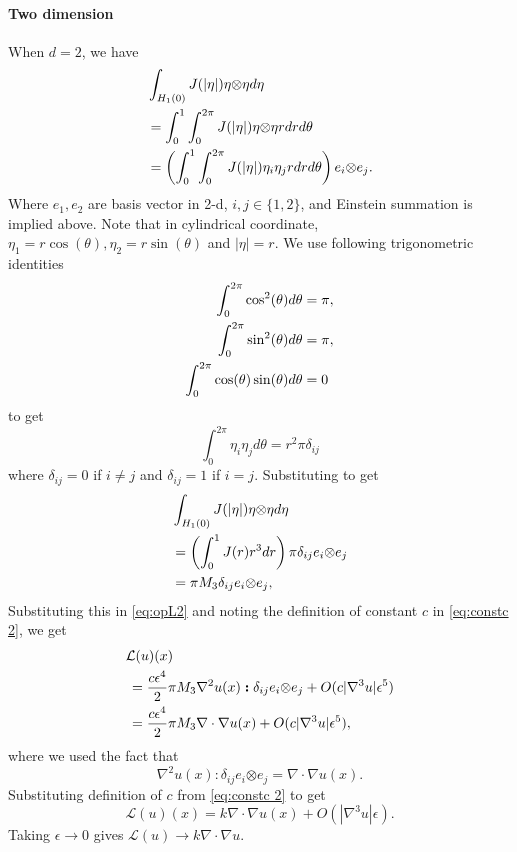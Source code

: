 \documentclass[11pt,twocolumn]{amsart}
\theoremstyle{definition}
\theoremstyle{definition}
\numberwithin{equation}{section}
\numberwithin{equation}{section}
\newcommand{\calL}{\mathcal{L}}  %
\newcommand{\bcolon}{\boldsymbol{:}}
\newcommand{\dyad}{\mathbf{\otimes}}
\begin{document}
\begin{appendices}
\paragraph{Two dimension} When $d=2$, we have
\begin{align*}
&\int_{H_1(0)}  J(|\eta|) \eta \dyad \eta d\eta\notag \\
&=\int_0^1 \int_0^{2\pi} J(|\eta|) \eta\dyad\eta rdrd\theta \notag \\
&= \left(\int_0^1 \int_0^{2\pi} J(|\eta|) \eta_i \eta_j rdrd\theta \right) e_i \dyad e_j.
\end{align*}
Where $e_1, e_2$ are basis vector in 2-d, $i,j\in \{1,2\}$, and Einstein summation is implied above. Note that in cylindrical coordinate, $\eta_1 = r\cos(\theta), \eta_2 = r\sin(\theta)$ and $|\eta| = r$. We use following trigonometric identities
\begin{align}\label{eq:trig}
\int_0^{2\pi} \cos^2(\theta) d\theta &= \pi, \notag \\
\int_0^{2\pi} \sin^2(\theta) d\theta &= \pi, \notag \\
\int_0^{2\pi} \cos(\theta) \sin(\theta) d\theta &= 0
\end{align}
to get 
$$
 \int_0^{2\pi} \eta_i \eta_j d\theta = r^2 \pi \delta_{ij}
$$
where $\delta_{ij} = 0$ if $i\neq j$ and $\delta_{ij} = 1$ if $i=j$. Substituting to get
\begin{align*}
&\int_{H_1(0)}  J(|\eta|) \eta \dyad \eta d\eta\notag \\
&= \left(\int_0^1 J(r)  r^3 dr \right) \pi \delta_{ij} e_i \dyad e_j \notag \\
&= \pi M_3 \delta_{ij} e_i \dyad e_j,
\end{align*}
Substituting this in \autoref{eq:opL2} and noting the definition of constant $c$ in \autoref{eq:constc 2}, we get
\begin{align*}
&\calL(u)(x) \notag \\
&\, = \frac{c\epsilon^{4}}{2} \pi M_3 \nabla^2 u(x) \bcolon \delta_{ij} e_i \dyad e_j  + O(c|\nabla^3 u| \epsilon^5)\notag \\
&\, =  \frac{c\epsilon^{4}}{2} \pi M_3 \nabla \cdot \nabla u(x) + O(c|\nabla^3 u| \epsilon^5),
\end{align*}
where we used the fact that $$\nabla^2 u(x) \bcolon \delta_{ij} e_i \dyad e_j  = \nabla \cdot \nabla u(x).$$ Substituting definition of $c$ from \autoref{eq:constc 2} to get
$$
\calL(u)(x) = k \nabla \cdot \nabla u(x) + O(|\nabla^3 u| \epsilon).
$$
Taking $\epsilon \to 0$ gives $\calL(u) \to k\nabla \cdot \nabla u$.



\end{appendices}
\end{document}
